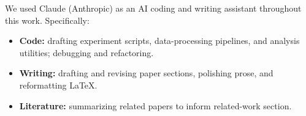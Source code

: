 We used Claude (Anthropic) as an AI coding and writing assistant throughout this work. Specifically:
\begin{itemize}
    \item \textbf{Code:} drafting experiment scripts, data-processing pipelines, and analysis utilities; debugging and refactoring.
    \item \textbf{Writing:} drafting and revising paper sections, polishing prose, and reformatting LaTeX.
    \item \textbf{Literature:} summarizing related papers to inform related-work section.
\end{itemize}

